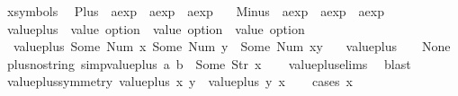 \begin{isabellebody}
\isamarkupfalse%
\ {\isacharparenleft}xsymbols{\isacharparenright}\isanewline
\ \ Plus\ {\isacharcolon}{\isacharcolon}\ {\isachardoublequoteopen}aexp\ {\isasymRightarrow}\ aexp\ {\isasymRightarrow}\ aexp{\isachardoublequoteclose}\ \isanewline
\ \ Minus\ {\isacharcolon}{\isacharcolon}\ {\isachardoublequoteopen}aexp\ {\isasymRightarrow}\ aexp\ {\isasymRightarrow}\ aexp{\isachardoublequoteclose}\ \isanewline
\isanewline
{}\isamarkupfalse%
\ value{\isacharunderscore}plus\ {\isacharcolon}{\isacharcolon}\ {\isachardoublequoteopen}value\ option\ {\isasymRightarrow}\ value\ option\ {\isasymRightarrow}\ value\ option{\isachardoublequoteclose}\ \ \isanewline
\ \ {\isachardoublequoteopen}value{\isacharunderscore}plus\ {\isacharparenleft}Some\ {\isacharparenleft}Num\ x{\isacharparenright}{\isacharparenright}\ {\isacharparenleft}Some\ {\isacharparenleft}Num\ y{\isacharparenright}{\isacharparenright}\ {\isacharequal}\ Some\ {\isacharparenleft}Num\ {\isacharparenleft}x{\isacharplus}y{\isacharparenright}{\isacharparenright}{\isachardoublequoteclose}\ {\isacharbar}\isanewline
\ \ {\isachardoublequoteopen}value{\isacharunderscore}plus\ {\isacharunderscore}\ {\isacharunderscore}\ {\isacharequal}\ None{\isachardoublequoteclose}\isanewline
\isanewline
{}\isamarkupfalse%
\ plus{\isacharunderscore}no{\isacharunderscore}string\ {\isacharbrackleft}simp{\isacharbrackright}{\isacharcolon}{\isachardoublequoteopen}value{\isacharunderscore}plus\ a\ b\ {\isasymnoteq}\ Some\ {\isacharparenleft}Str\ x{\isacharparenright}{\isachardoublequoteclose}\isanewline
%
\isadelimproof
\ \ %
\endisadelimproof
%
\isatagproof
{}\isamarkupfalse%
\ value{\isacharunderscore}plus{\isachardot}elims\ \isamarkupfalse%
\ blast%
\endisatagproof
{\isafoldproof}%
%
\isadelimproof
\isanewline
%
\endisadelimproof
\isanewline
{}\isamarkupfalse%
\ value{\isacharunderscore}plus{\isacharunderscore}symmetry{\isacharcolon}\ {\isachardoublequoteopen}value{\isacharunderscore}plus\ x\ y\ {\isacharequal}\ value{\isacharunderscore}plus\ y\ x{\isachardoublequoteclose}\isanewline
%
\isadelimproof
\ \ %
\endisadelimproof
%
\isatagproof
{}\isamarkupfalse%
\ {\isacharparenleft}cases\ x{\isacharparenright}\isanewline
\ \ \ \ \isamarkupfalse%

\end{isabellebody}
